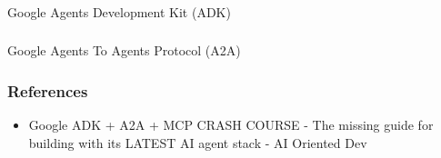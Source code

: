 \begin{frame}[fragile]\frametitle{}
\begin{center}
{\Large Google Agents Development Kit (ADK)}
\end{center}
\end{frame}

\begin{frame}[fragile]\frametitle{}
\begin{center}
{\Large Google Agents To Agents Protocol (A2A)}
\end{center}
\end{frame}

\begin{frame}[fragile]\frametitle{References}
    \begin{itemize}
        \item Google ADK + A2A + MCP CRASH COURSE - The missing guide for building with its LATEST AI agent stack - AI Oriented Dev
    \end{itemize}
\end{frame}

